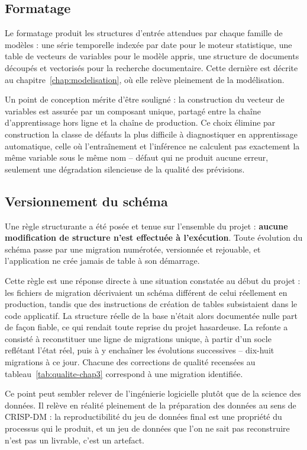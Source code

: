 \subsection{Formatage}

Le formatage produit les structures d'entrée attendues par chaque famille de modèles : une série temporelle indexée par date pour le moteur statistique, une table de vecteurs de variables pour le modèle appris, une structure de documents découpés et vectorisés pour la recherche documentaire. Cette dernière est décrite au chapitre~\ref{chap:modelisation}, où elle relève pleinement de la modélisation.

Un point de conception mérite d'être souligné : la construction du vecteur de variables est assurée par un composant unique, partagé entre la chaîne d'apprentissage hors ligne et la chaîne de production. Ce choix élimine par construction la classe de défauts la plus difficile à diagnostiquer en apprentissage automatique, celle où l'entraînement et l'inférence ne calculent pas exactement la même variable sous le même nom -- défaut qui ne produit aucune erreur, seulement une dégradation silencieuse de la qualité des prévisions.

\subsection{Versionnement du schéma}
\label{sec:versionnement}

Une règle structurante a été posée et tenue sur l'ensemble du projet : \textbf{aucune modification de structure n'est effectuée à l'exécution}. Toute évolution du schéma passe par une migration numérotée, versionnée et rejouable, et l'application ne crée jamais de table à son démarrage.

Cette règle est une réponse directe à une situation constatée au début du projet : les fichiers de migration décrivaient un schéma différent de celui réellement en production, tandis que des instructions de création de tables subsistaient dans le code applicatif. La structure réelle de la base n'était alors documentée nulle part de façon fiable, ce qui rendait toute reprise du projet hasardeuse. La refonte a consisté à reconstituer une ligne de migrations unique, à partir d'un socle reflétant l'état réel, puis à y enchaîner les évolutions successives -- dix-huit migrations à ce jour. Chacune des corrections de qualité recensées au tableau~\ref{tab:qualite-chap3} correspond à une migration identifiée.

Ce point peut sembler relever de l'ingénierie logicielle plutôt que de la science des données. Il relève en réalité pleinement de la préparation des données au sens de CRISP-DM : la reproductibilité du jeu de données final est une propriété du processus qui le produit, et un jeu de données que l'on ne sait pas reconstruire n'est pas un livrable, c'est un artefact.

